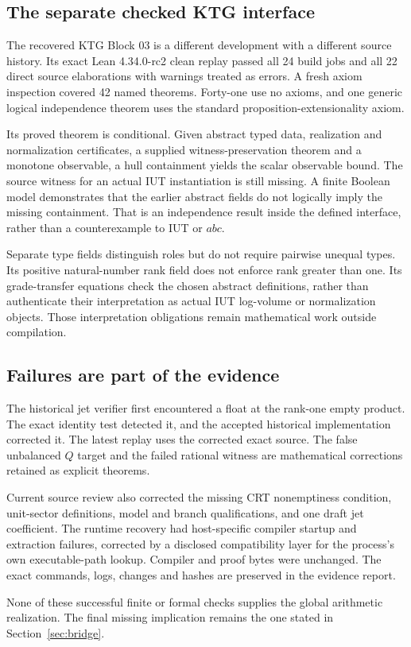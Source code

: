 \subsection{The separate checked KTG interface}
The recovered KTG Block 03 is a different development with a different source history. Its exact Lean 4.34.0-rc2 clean replay passed all 24 build jobs and all 22 direct source elaborations with warnings treated as errors. A fresh axiom inspection covered 42 named theorems. Forty-one use no axioms, and one generic logical independence theorem uses the standard proposition-extensionality axiom.

Its proved theorem is conditional. Given abstract typed data, realization and normalization certificates, a supplied witness-preservation theorem and a monotone observable, a hull containment yields the scalar observable bound. The source witness for an actual IUT instantiation is still missing. A finite Boolean model demonstrates that the earlier abstract fields do not logically imply the missing containment. That is an independence result inside the defined interface, rather than a counterexample to IUT or $abc$.

Separate type fields distinguish roles but do not require pairwise unequal types. Its positive natural-number rank field does not enforce rank greater than one. Its grade-transfer equations check the chosen abstract definitions, rather than authenticate their interpretation as actual IUT log-volume or normalization objects. Those interpretation obligations remain mathematical work outside compilation.

\subsection{Failures are part of the evidence}
The historical jet verifier first encountered a float at the rank-one empty product. The exact identity test detected it, and the accepted historical implementation corrected it. The latest replay uses the corrected exact source. The false unbalanced $Q$ target and the failed rational witness are mathematical corrections retained as explicit theorems.

Current source review also corrected the missing CRT nonemptiness condition, unit-sector definitions, model and branch qualifications, and one draft jet coefficient. The runtime recovery had host-specific compiler startup and extraction failures, corrected by a disclosed compatibility layer for the process's own executable-path lookup. Compiler and proof bytes were unchanged. The exact commands, logs, changes and hashes are preserved in the evidence report.

None of these successful finite or formal checks supplies the global arithmetic realization. The final missing implication remains the one stated in Section~\ref{sec:bridge}.
